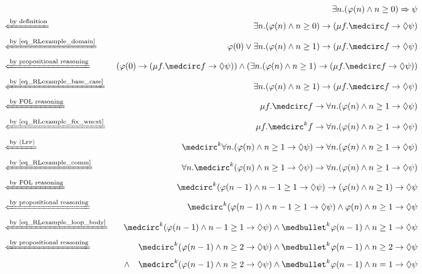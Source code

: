 \documentclass[letter,12pt]{article}
\newcommand{\imp}{\to}
\newcommand{\To}{\Rightarrow}
\newcommand{\prule}[1]{\textsc{(#1)}}
\newcommand{\Lfp}{\prule{Lfp}\xspace}
\newcommand{\xif}[1]{\xLeftarrow{\text{#1}}}
\newcommand{\wnext}{{\medcirc}}
\newcommand{\snext}{{\medbullet}}
\newcommand{\eventually}{{\lozenge}}
\begin{document}
\begin{figure}
{
\small
\begin{align*}
&&
\exists n . (\varphi(n) \wedge n \ge 0) \To \psi
\\
&\xif{by definition}&
\exists n . (\varphi(n) \wedge n \ge 0) \imp (\mu f . \wnext f 
\imp \eventually\psi)
\\
&\xif{by~\eqref{eq_RLexample_domain}}&
\varphi(0) \vee \exists n . (\varphi(n) \wedge n \ge 1)
\imp (\mu f . \wnext f \imp\eventually \psi)
\\
&\xif{by propositional reasoning}&
(\varphi(0) \imp (\mu f . \wnext f \imp\eventually \psi))
\wedge (\exists n . (\varphi(n) \wedge n \ge 1)
\imp (\mu f . \wnext f \imp\eventually \psi))
\\
&\xif{by~\eqref{eq_RLexample_base_case}}&
\exists n . (\varphi(n) \wedge n \ge 1)
\imp (\mu f . \wnext f \imp\eventually \psi)
\\
&\xif{by FOL reasoning}&
\mu f . \wnext f \imp \forall n .
(\varphi(n) \wedge n \ge 1 \imp \eventually \psi)
\\
&\xif{by~\eqref{eq_RLexample_fix_wnext}}&
\mu f . \wnext^k f \imp \forall n .
(\varphi(n) \wedge n \ge 1 \imp \eventually \psi)
\\
&\xif{by~\Lfp}&
\wnext^k \forall n . (\varphi(n) \wedge n \ge 1 \imp \eventually \psi)
\imp
\forall n . (\varphi(n) \wedge n \ge 1 \imp \eventually \psi)
\\
&\xif{by~\eqref{eq_RLexample_comm}}&
\forall n . \wnext^k  (\varphi(n) \wedge n \ge 1 \imp \eventually \psi)
\imp
\forall n . (\varphi(n) \wedge n \ge 1 \imp \eventually \psi)
\\
&\xif{by FOL reasoning}&
\wnext^k  (\varphi(n-1) \wedge n-1 \ge 1 \imp \eventually \psi)
\imp
(\varphi(n) \wedge n \ge 1) \imp \eventually \psi
\\
&\xif{by propositional reasoning}&
\wnext^k  (\varphi(n-1) \wedge n-1 \ge 1 \imp \eventually \psi)
\wedge
\varphi(n) \wedge n \ge 1 \imp \eventually \psi
\\
&\xif{by~\eqref{eq_RLexample_loop_body}}&
\wnext^k  (\varphi(n-1) \wedge n-1 \ge 1 \imp \eventually \psi)
\wedge
\snext^k \varphi(n-1) \wedge n \ge 1 \imp \eventually \psi
\\
&\xif{by propositional reasoning}&
\wnext^k  (\varphi(n-1) \wedge n \ge 2 \imp \eventually \psi)
\wedge \snext^k \varphi(n-1) \wedge n \ge 2 \imp \eventually \psi
\\&&
\wedge\quad
\wnext^k  (\varphi(n-1) \wedge n \ge 2 \imp \eventually \psi)
\wedge \snext^k \varphi(n-1) \wedge n = 1 \imp \eventually \psi

\end{align*}}
\end{figure}
\end{document}
